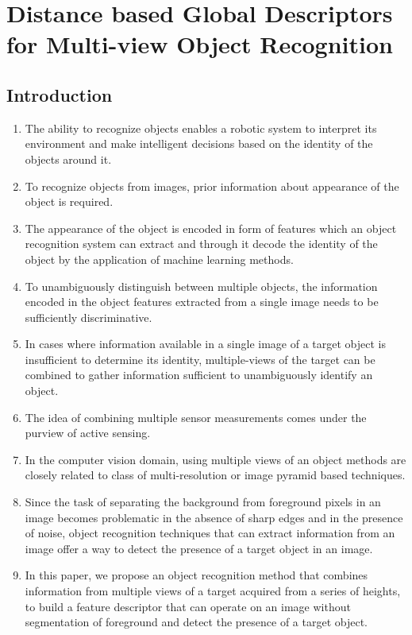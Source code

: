 \documentclass {udthesis}
\begin{document}

\chapter{Distance based Global Descriptors for Multi-view Object Recognition}
\label{chap:distdes}

\section{Introduction}
\begin{enumerate}
	\item The ability to recognize objects enables a robotic system to interpret its environment and make intelligent decisions based on the identity of the objects around it.
	
	\item To recognize objects from images, prior information about appearance of the object is required.
	
	\item The appearance of the object is encoded in form of features which an object recognition system can extract and through it decode the identity of the object by the application of machine learning methods.

	\item To unambiguously distinguish between multiple objects, the information encoded in the object features extracted from a single image needs to be sufficiently discriminative.
	
	\item In cases where information available in a single image of a target object is insufficient to determine its identity, multiple-views of the target can be combined to gather information sufficient to unambiguously identify an object.
	
	\item The idea of combining multiple sensor measurements comes under the purview of active sensing.

	\item In the computer vision domain, using multiple views of an object methods are closely related to class of multi-resolution or image pyramid based techniques.

	\item Since the task of separating the background from foreground pixels in an image becomes problematic in the absence of sharp edges and in the presence of noise, object recognition techniques that can extract information from an image offer a way to detect the presence of a target object in an image.
		
	\item In this paper, we propose an object recognition method that combines information from multiple views of a target acquired from a series of heights, to build a feature descriptor that can operate on an image without segmentation of foreground and detect the presence of a target object.	
\end{enumerate}
\end{document}
